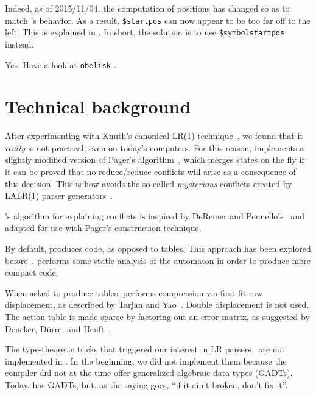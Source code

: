 \documentclass[onecolumn,11pt,nocopyrightspace,preprint]{sigplanconf}
\begin{document}
Indeed, as of 2015/11/04, the computation of positions has changed so as to match \ocamlyacc's
behavior. As a result, \texttt{\$startpos} can now appear to be too far off to the left. This is explained
in . In short, the solution is to use \verb+$symbolstartpos+ instead.

Yes. Have a look at \texttt{obelisk} \cite{obelisk}.


\section{Technical background}

After experimenting with Knuth's canonical LR(1) technique~\cite{knuth-lr-65},
we found that it \emph{really} is not practical, even on today's computers.
For this reason, \menhir implements a slightly modified version of Pager's
algorithm~\cite{pager-77}, which merges states on the fly if it can be proved
that no reduce/reduce conflicts will arise as a consequence of this decision.
This is how \menhir avoids the so-called \emph{mysterious} conflicts created
by LALR(1) parser generators~\cite[section 5.7]{bison}.

\menhir's algorithm for explaining conflicts is inspired by DeRemer and
Pennello's~\cite{deremer-pennello-82} and adapted for use with Pager's
construction technique.

By default, \menhir produces code, as opposed to tables. This approach has
been explored before~\cite{bhamidipaty-proebsting-98,horspool-faster-90}.
\menhir performs some static analysis of the automaton in order to produce
more compact code.

When asked to produce tables, \menhir performs compression via first-fit
row displacement, as described by Tarjan and Yao~\cite{tarjan-yao-79}.
Double displacement is not used. The action table is made sparse by
factoring out an error matrix, as suggested by Dencker, Dürre, and
Heuft~\cite{dencker-84}.

The type-theoretic tricks that triggered our interest in LR
parsers~\cite{pottier-regis-gianas-typed-lr} are not implemented in \menhir.
In the beginning, we did not implement them because the \ocaml compiler did
not at the time offer generalized algebraic data types (GADTs). Today, \ocaml
has GADTs, but, as the saying goes, ``if it ain't broken, don't fix it''.
\end{document}
